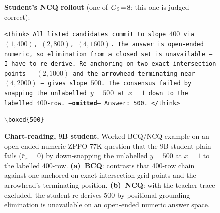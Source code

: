 \begin{figure}[!p]
\begin{prompttemplatefig}
\textbf{Student's NCQ rollout} (one of $G_{\rm S}\!=\!8$; this one is judged correct):

\smallskip
\texttt{<think> All listed candidates commit to slope $400$ via $(1, 400)$, $(2, 800)$, $(4, 1600)$. The answer is open-ended numeric, so elimination from a closed set is unavailable -- I have to re-derive. Re-anchoring on two exact-intersection points -- $(2, 1000)$ and the arrowhead terminating near $(4, 2000)$ -- gives slope $500$. The consensus failed by snapping the unlabelled $y\!=\!500$ at $x\!=\!1$ down to the labelled $400$-row. ---\textbf{omitted}--- Answer: 500. </think>}

\smallskip
\texttt{$\backslash$boxed\{500\}} \quad \textcolor{posgain}{\checkmark}
\end{prompttemplatefig}

\caption{\textbf{Chart-reading, $9$B student.} Worked BCQ/NCQ example on an open-ended numeric ZPPO-$77$K question that the $9$B student plain-fails ($\bar{r}_x\!=\!0$) by down-snapping the unlabelled $y\!=\!500$ at $x\!=\!1$ to the labelled $400$-row. \textbf{(a)~BCQ}: contrasts that $400$-row chain against one anchored on exact-intersection grid points and the arrowhead's terminating position. \textbf{(b)~NCQ}: with the teacher trace excluded, the student re-derives $500$ by positional grounding -- elimination is unavailable on an open-ended numeric answer space.}
\label{fig:appendix:bcq_ncq_airplane}
\end{figure}
